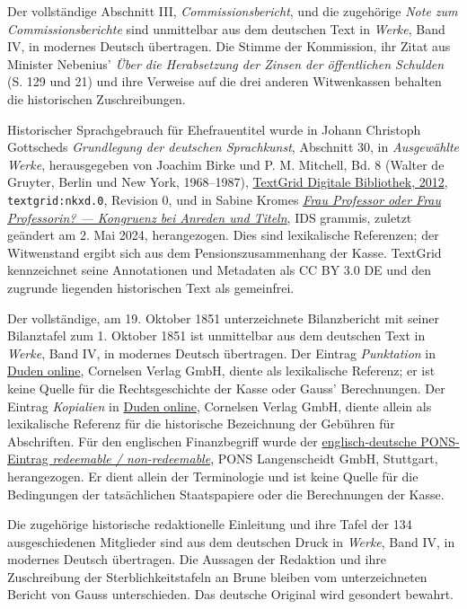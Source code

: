 \par\medskip\noindent Der vollständige Abschnitt III, \textit{Commissionsbericht}, und die zugehörige \textit{Note zum Commissionsberichte} sind unmittelbar aus dem deutschen Text in \textit{Werke}, Band IV, in modernes Deutsch übertragen. Die Stimme der Kommission, ihr Zitat aus Minister Nebenius' \textit{Über die Herabsetzung der Zinsen der öffentlichen Schulden} (S. 129 und 21) und ihre Verweise auf die drei anderen Witwenkassen behalten die historischen Zuschreibungen.\par\medskip\noindent Historischer Sprachgebrauch für Ehefrauentitel wurde in Johann Christoph Gottscheds \textit{Grundlegung der deutschen Sprachkunst}, Abschnitt 30, in \textit{Ausgewählte Werke}, herausgegeben von Joachim Birke und P. M. Mitchell, Bd. 8 (Walter de Gruyter, Berlin und New York, 1968--1987), \href{https://www.textgridrep.org/browse/nkxb.0}{TextGrid Digitale Bibliothek, 2012}, \texttt{textgrid:nkxd.0}, Revision 0, und in Sabine Kromes \href{https://grammis.ids-mannheim.de/fragen/3050}{\textit{Frau Professor oder Frau Professorin? --- Kongruenz bei Anreden und Titeln}}, IDS grammis, zuletzt geändert am 2. Mai 2024, herangezogen. Dies sind lexikalische Referenzen; der Witwenstand ergibt sich aus dem Pensionszusammenhang der Kasse. TextGrid kennzeichnet seine Annotationen und Metadaten als CC BY 3.0 DE und den zugrunde liegenden historischen Text als gemeinfrei.
\par\medskip\noindent Der vollständige, am 19. Oktober 1851 unterzeichnete Bilanzbericht mit seiner Bilanztafel zum 1. Oktober 1851 ist unmittelbar aus dem deutschen Text in \textit{Werke}, Band IV, in modernes Deutsch übertragen. Der Eintrag \textit{Punktation} in \href{https://www.duden.de/rechtschreibung/Punktation}{Duden online}, Cornelsen Verlag GmbH, diente als lexikalische Referenz; er ist keine Quelle für die Rechtsgeschichte der Kasse oder Gauss' Berechnungen. Der Eintrag \textit{Kopialien} in \href{https://www.duden.de/rechtschreibung/Kopialien}{Duden online}, Cornelsen Verlag GmbH, diente allein als lexikalische Referenz für die historische Bezeichnung der Gebühren für Abschriften. Für den englischen Finanzbegriff wurde der \href{https://de.pons.com/\%C3\%BCbersetzung/englisch-deutsch/redeemable}{englisch-deutsche PONS-Eintrag \textit{redeemable / non-redeemable}}, PONS Langenscheidt GmbH, Stuttgart, herangezogen. Er dient allein der Terminologie und ist keine Quelle für die Bedingungen der tatsächlichen Staatspapiere oder die Berechnungen der Kasse.
\par\medskip\noindent Die zugehörige historische redaktionelle Einleitung und ihre Tafel der 134 ausgeschiedenen Mitglieder sind aus dem deutschen Druck in \textit{Werke}, Band IV, in modernes Deutsch übertragen. Die Aussagen der Redaktion und ihre Zuschreibung der Sterblichkeitstafeln an Brune bleiben vom unterzeichneten Bericht von Gauss unterschieden. Das deutsche Original wird gesondert bewahrt.

